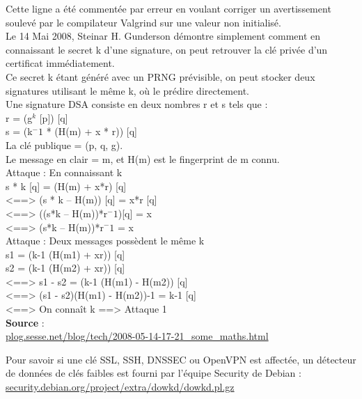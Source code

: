 \documentclass{article}
\begin{document}
	Cette ligne a été commentée par erreur en voulant corriger un
	avertissement soulevé par le compilateur Valgrind sur une valeur
	non initialisé.\\
	
	Le 14 Mai 2008, Steinar H. Gunderson démontre simplement comment
	en connaissant le secret k d'une signature, on peut retrouver
	la clé privée d'un certificat immédiatement.\\
	
	Ce secret k étant généré avec un PRNG prévisible, on peut stocker
	deux signatures utilisant le même k, où le prédire directement.\\
	
	Une signature DSA consiste en deux nombres r et s tels que :\\
	r = (g$^k$ [p]) [q]\\
	s = (k$^-1$ * (H(m) + x * r)) [q]\\
	
	La clé publique = (p, q, g).\\
	Le message en clair = m, et H(m) est le fingerprint de m connu.\\
	
	Attaque  : En connaissant k	\\
	s * k [q] = (H(m) + x*r) [q]\\
	<==> (s * k – H(m)) [q] = x*r [q]\\
	<==> ((s*k – H(m))*r$^-1$)[q] = x\\
	<==> (s*k – H(m))*r$^-1$ = x\\
	
	Attaque  : Deux messages possèdent le même k\\
	s1 = (k-1 (H(m1) + xr)) [q]\\
	s2 = (k-1 (H(m2) + xr)) [q]\\
	<==> s1 - s2 = (k-1 (H(m1) - H(m2)) [q]\\
	<==> (s1 - s2)(H(m1) - H(m2))-1 = k-1 [q]\\
	<==> On connaît k ==> Attaque 1\\
	
	\textbf{Source} : \\
	\href{http://plog.sesse.net/blog/tech/2008-05-14-17-21_some_maths.html}
	{plog.sesse.net/blog/tech/2008-05-14-17-21\_some\_maths.html}	
	
	Pour savoir si une clé SSL, SSH, DNSSEC ou OpenVPN est affectée, un 	
	détecteur de données de clés faibles est fourni par l'équipe 
	Security de Debian : \\
	\href{http://security.debian.org/project/extra/dowkd/dowkd.pl.gz}
	{security.debian.org/project/extra/dowkd/dowkd.pl.gz} \\
\end{document}
